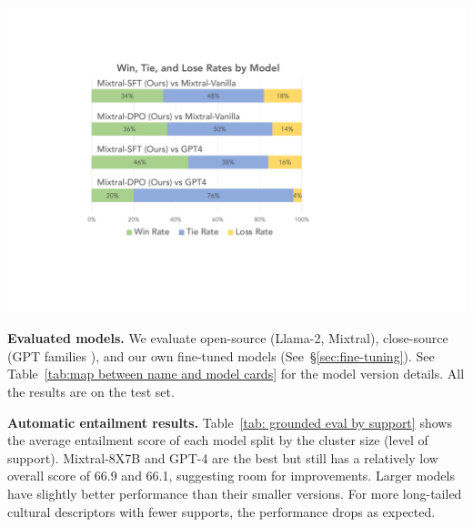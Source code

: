 \documentclass{article} %
\newcommand{\diyi}[1]{\textcolor{blue}{[#1 --diyi]}}
\begin{document}
\begin{minipage}[c]{0.48\textwidth}
\centering
\includegraphics[width=\textwidth]{./img/win_rate.pdf}
\end{minipage}


\noindent\textbf{Evaluated models.} We evaluate open-source (Llama-2, Mixtral), close-source (GPT families \citep{achiam2023gpt}), and our own fine-tuned models (See~\S\ref{sec:fine-tuning}). See Table~\ref{tab:map between name and model cards} for the model version details. All the results are on the test set.  




\noindent\textbf{Automatic entailment results.} 
Table~\ref{tab: grounded eval by support} shows the average entailment score of each model split by the cluster size (level of support). %
Mixtral-8X7B and GPT-4 are the best but still has a relatively low overall score of 66.9 and 66.1, suggesting room for improvements. Larger models have slightly better performance than their smaller versions. For more long-tailed cultural descriptors with fewer supports, the  performance drops as expected.  %
\end{document}
